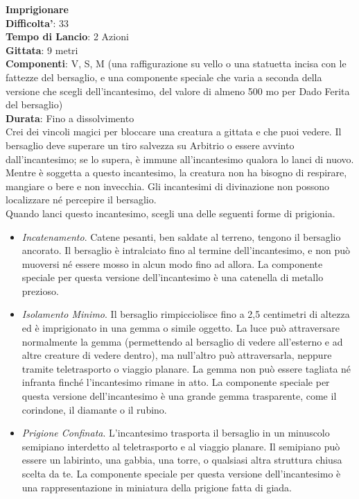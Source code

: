 \begin{multicols}{2}
\medskip\textbf{Imprigionare}\\
\textbf{Difficolta'}: 33\\
\textbf{Tempo di Lancio}: 2 Azioni\\
\textbf{Gittata}: 9 metri\\
\textbf{Componenti}: V, S, M (una raffigurazione su vello o una statuetta incisa con le fattezze del bersaglio, e una componente speciale che varia a seconda della versione che scegli dell’incantesimo, del valore di almeno 500 mo per Dado Ferita del bersaglio)\\
\textbf{Durata}: Fino a dissolvimento\\
Crei dei vincoli magici per bloccare una creatura a gittata e che puoi vedere. Il bersaglio deve superare un tiro salvezza su Arbitrio o essere avvinto dall’incantesimo; se lo supera, è immune all’incantesimo qualora lo lanci di nuovo. Mentre è soggetta a questo incantesimo, la creatura non ha bisogno di respirare, mangiare o bere e non invecchia. Gli incantesimi di divinazione non possono localizzare né percepire il bersaglio.\\
Quando lanci questo incantesimo, scegli una delle seguenti forme di prigionia.
\medskip
\begin{itemize}
\item
\textit{Incatenamento}. Catene pesanti, ben saldate al terreno, tengono il bersaglio ancorato. Il bersaglio è intralciato fino al termine dell’incantesimo, e non può muoversi né essere mosso in alcun modo fino ad allora. La componente speciale per questa versione dell’incantesimo è una catenella di metallo prezioso. 
\item
\textit{Isolamento Minimo}. Il bersaglio rimpicciolisce fino a 2,5 centimetri di altezza ed è imprigionato in una gemma o simile oggetto. La luce può attraversare normalmente la gemma (permettendo al bersaglio di vedere all’esterno e ad altre creature di vedere dentro), ma null’altro può attraversarla, neppure tramite teletrasporto o viaggio planare. La gemma non può essere tagliata né infranta finché l’incantesimo rimane in atto. La componente speciale per questa versione dell’incantesimo è una grande gemma trasparente, come il corindone, il diamante o il rubino.
\item
\textit{Prigione Confinata}. L’incantesimo trasporta il bersaglio in un minuscolo semipiano interdetto al teletrasporto e al viaggio planare. Il semipiano può essere un labirinto, una gabbia, una torre, o qualsiasi altra struttura chiusa scelta da te. La componente speciale per questa versione dell’incantesimo è una rappresentazione in miniatura della prigione fatta di giada.

\end{itemize}
\end{multicols}
